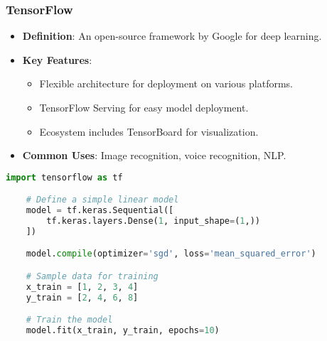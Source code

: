 \documentclass{beamer}
\begin{document}
\begin{frame}[fragile]
    \frametitle{TensorFlow}
    \begin{itemize}
        \item \textbf{Definition}: An open-source framework by Google for deep learning.
        \item \textbf{Key Features}:
        \begin{itemize}
            \item Flexible architecture for deployment on various platforms.
            \item TensorFlow Serving for easy model deployment.
            \item Ecosystem includes TensorBoard for visualization.
        \end{itemize}
        \item \textbf{Common Uses}: Image recognition, voice recognition, NLP.
    \end{itemize}
    
    \begin{lstlisting}[language=Python, caption=Example Code Snippet]
    import tensorflow as tf

    # Define a simple linear model
    model = tf.keras.Sequential([
        tf.keras.layers.Dense(1, input_shape=(1,))
    ])

    model.compile(optimizer='sgd', loss='mean_squared_error')

    # Sample data for training
    x_train = [1, 2, 3, 4]
    y_train = [2, 4, 6, 8]

    # Train the model
    model.fit(x_train, y_train, epochs=10)
    \end{lstlisting}
\end{frame}
\end{document}
